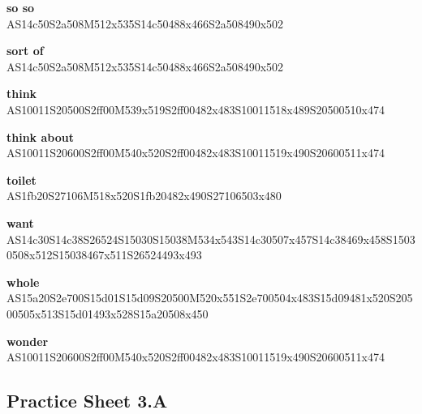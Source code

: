 \documentclass{article}
\begin{document}
\begin{glossary}
\textbf{so so}\\
AS14c50S2a508M512x535S14c50488x466S2a508490x502

\textbf{sort of}\\
AS14c50S2a508M512x535S14c50488x466S2a508490x502

\textbf{think}\\
AS10011S20500S2ff00M539x519S2ff00482x483S10011518x489S20500510x474

\textbf{think about}\\
AS10011S20600S2ff00M540x520S2ff00482x483S10011519x490S20600511x474

\textbf{toilet}\\
AS1fb20S27106M518x520S1fb20482x490S27106503x480

\textbf{want}\\
AS14c30S14c38S26524S15030S15038M534x543S14c30507x457S14c38469x458S15030508x512S15038467x511S26524493x493

\textbf{whole}\\
AS15a20S2e700S15d01S15d09S20500M520x551S2e700504x483S15d09481x520S20500505x513S15d01493x528S15a20508x450

\textbf{wonder}\\
AS10011S20600S2ff00M540x520S2ff00482x483S10011519x490S20600511x474

\end{glossary}

\subsection{Practice Sheet 3.A}
\end{document}

